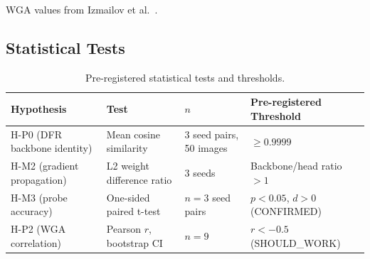WGA values from Izmailov et al.\ \cite{izmailov2022feature}.

\subsection{Statistical Tests}

\begin{table}[h]
\centering
\caption{Pre-registered statistical tests and thresholds.}
\label{tab:stats}
\begin{tabular}{@{}llll@{}}
\toprule
Hypothesis & Test & $n$ & Pre-registered Threshold \\
\midrule
H-P0 (DFR backbone identity) & Mean cosine similarity & 3 seed pairs, 50 images & $\geq 0.9999$ \\
H-M2 (gradient propagation) & L2 weight difference ratio & 3 seeds & Backbone/head ratio $> 1$ \\
H-M3 (probe accuracy) & One-sided paired t-test & $n=3$ seed pairs & $p < 0.05$, $d > 0$ (CONFIRMED) \\
H-P2 (WGA correlation) & Pearson $r$, bootstrap CI & $n=9$ & $r < -0.5$ (SHOULD\_WORK) \\
\bottomrule
\end{tabular}
\end{table}
